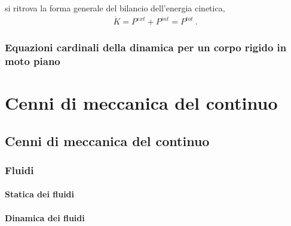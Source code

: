 \documentclass[letterpaper,10pt,italian]{jupyterBook}
\begin{document}
\sphinxAtStartPar
si ritrova la forma generale del bilancio dell’energia cinetica,
\begin{equation*}
\begin{split}\dot{K} = P^{ext} + P^{int} = P^{tot} \ .\end{split}
\end{equation*}

\section{Equazioni cardinali della dinamica per un corpo rigido in moto piano}
\label{\detokenize{ch/mechanics/dynamics-notes:equazioni-cardinali-della-dinamica-per-un-corpo-rigido-in-moto-piano}}\label{\detokenize{ch/mechanics/dynamics-notes:physics-hs-mechanics-dynamics-eom-rigid-2d}}
\sphinxAtStartPar
{}

\sphinxstepscope


\part{Cenni di meccanica del continuo}

\sphinxstepscope


\chapter{Cenni di meccanica del continuo}
\label{\detokenize{ch/continuum/intro:cenni-di-meccanica-del-continuo}}\label{\detokenize{ch/continuum/intro:physics-hs-continuum}}\label{\detokenize{ch/continuum/intro::doc}}

\section{Fluidi}
\label{\detokenize{ch/continuum/intro:fluidi}}\label{\detokenize{ch/continuum/intro:continuum-fluids}}

\subsection{Statica dei fluidi}
\label{\detokenize{ch/continuum/intro:statica-dei-fluidi}}\label{\detokenize{ch/continuum/intro:fluids-statics}}

\subsection{Dinamica dei fluidi}
\label{\detokenize{ch/continuum/intro:dinamica-dei-fluidi}}\label{\detokenize{ch/continuum/intro:fluids-dynamics}}
\end{document}
